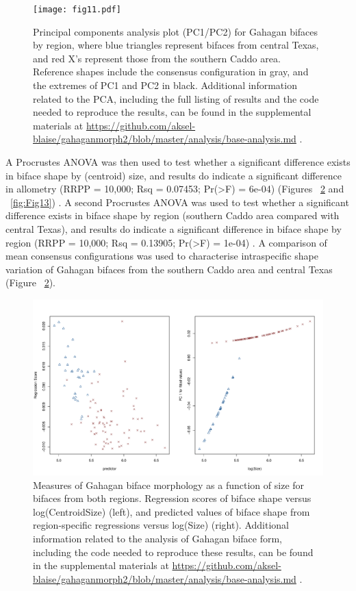 \documentclass[review]{elsarticle}
\begin{document}
\begin{figure}[h!]\centering
\texttt{[image: fig11.pdf]}
\caption{Principal components analysis plot (PC1/PC2) for Gahagan bifaces by region, where blue triangles represent bifaces from central Texas, and red X's represent those from the southern Caddo area. Reference shapes include the consensus configuration in gray, and the extremes of PC1 and PC2 in black. Additional information related to the PCA, including the full listing of results and the code needed to reproduce the results, can be found in the supplemental materials at \href{https://github.com/aksel-blaise/gahaganmorph2/blob/master/analysis/base-analysis.md}{https://github.com/aksel-blaise/gahaganmorph2/blob/master/analysis/base-analysis.md} \citep{RN20850}.}
\label{fig:Fig11}
\end{figure}

A Procrustes ANOVA was then used to test whether a significant difference exists in biface shape by (centroid) size, and results do indicate a significant difference in allometry (RRPP = 10,000; Rsq = 0.07453; Pr(>F) = 6e-04) (Figures ~\ref{fig:Fig12} and ~\ref{fig:Fig13}) \citep{RN20850}. A second Procrustes ANOVA was used to test whether a significant difference exists in biface shape by region (southern Caddo area compared with central Texas), and results do indicate a significant difference in biface shape by region (RRPP = 10,000; Rsq = 0.13905; Pr(>F) = 1e-04) \citep{RN20850}. A comparison of mean consensus configurations was used to characterise intraspecific shape variation of Gahagan bifaces from the southern Caddo area and central Texas (Figure ~\ref{fig:Fig12}).

\begin{figure}[h!]\centering
\includegraphics[width=\linewidth]{fig12.pdf}
\caption{Measures of Gahagan biface morphology as a function of size for bifaces from both regions. Regression scores of biface shape versus log(CentroidSize) (left), and predicted values of biface shape from region-specific regressions versus log(Size) (right). Additional information related to the analysis of Gahagan biface form, including the code needed to reproduce these results, can be found in the supplemental materials at \href{https://github.com/aksel-blaise/gahaganmorph2/blob/master/analysis/base-analysis.md}{https://github.com/aksel-blaise/gahaganmorph2/blob/master/analysis/base-analysis.md} \citep{RN20850}.}
\label{fig:Fig12}
\end{figure}
\end{document}
